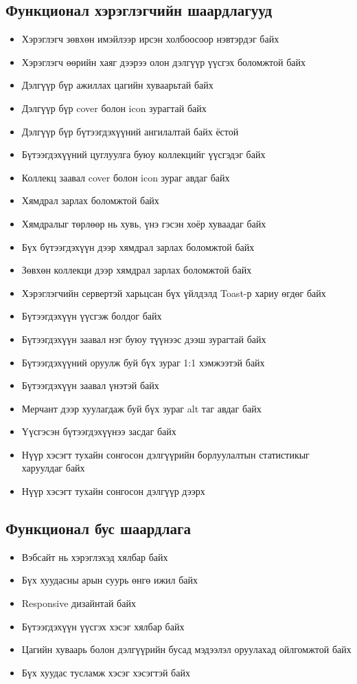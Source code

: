    \subsection{Функционал хэрэглэгчийн шаардлагууд}
     \begin{itemize}
        \item Хэрэглэгч зөвхөн имэйлээр ирсэн холбоосоор нэвтэрдэг байх
        \item Хэрэглэгч өөрийн хаяг дээрээ олон дэлгүүр үүсгэх боломжтой байх
        \item Дэлгүүр бүр ажиллах цагийн хуваарьтай байх
        \item Дэлгүүр бүр cover болон icon зурагтай байх
        \item Дэлгүүр бүр бүтээгдэхүүний ангилалтай байх ёстой
        \item Бүтээгдэхүүний цуглуулга буюу коллекцийг үүсгэдэг байх
        \item Коллекц заавал cover болон icon зураг авдаг байх
        \item Хямдрал зарлах боломжтой байх
        \item Хямдралыг төрлөөр нь хувь, үнэ гэсэн хоёр хуваадаг байх
        \item Бүх бүтээгдэхүүн дээр хямдрал зарлах боломжтой байх
        \item Зөвхөн коллекци дээр хямдрал зарлах боломжтой байх
        \item Хэрэглэгчийн сервертэй харьцсан бүх үйлдэлд Toast-р хариу өгдөг байх
        \item Бүтээгдэхүүн үүсгэж болдог байх
        \item Бүтээгдэхүүн заавал нэг буюу түүнээс дээш зурагтай байх
        \item Бүтээгдэхүүний оруулж буй бүх зураг 1:1 хэмжээтэй байх
        \item Бүтээгдэхүүн заавал үнэтэй байх
        \item Мерчант дээр хуулагдаж буй бүх зураг alt таг авдаг байх
        \item Үүсгэсэн бүтээгдэхүүнээ засдаг байх
        \item Нүүр хэсэгт тухайн сонгосон дэлгүүрийн борлуулалтын статистикыг харуулдаг байх
        \item Нүүр хэсэгт тухайн сонгосон дэлгүүр дээрх 
    \end{itemize}
    \subsection{Функционал бус шаардлага}
    \begin{itemize}
        \item Вэбсайт нь хэрэглэхэд хялбар байх
        \item Бүх хуудасны арын суурь өнгө ижил байх
        \item Responsive дизайнтай байх
        \item Бүтээгдэхүүн үүсгэх хэсэг хялбар байх
        \item Цагийн хуваарь болон дэлгүүрийн бусад мэдээлэл оруулахад ойлгомжтой байх
        \item Бүх хуудас тусламж хэсэг хэсэгтэй байх
    \end{itemize}
